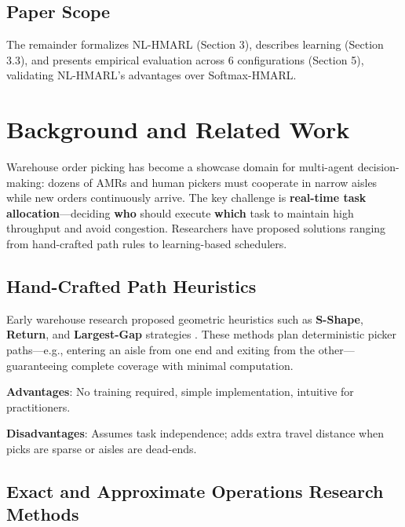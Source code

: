 \documentclass[12pt,a4paper]{article}
\begin{document}
\subsection{Paper Scope}

The remainder formalizes NL-HMARL (Section 3), describes learning (Section 3.3), and presents empirical evaluation across 6 configurations (Section 5), validating NL-HMARL's advantages over Softmax-HMARL.

\section{Background and Related Work}

Warehouse order picking has become a showcase domain for multi-agent decision-making: dozens of AMRs and human pickers must cooperate in narrow aisles while new orders continuously arrive. The key challenge is \textbf{real-time task allocation}---deciding \textbf{who} should execute \textbf{which} task to maintain high throughput and avoid congestion. Researchers have proposed solutions ranging from hand-crafted path rules to learning-based schedulers.

\subsection{Hand-Crafted Path Heuristics}

Early warehouse research proposed geometric heuristics such as \textbf{S-Shape}, \textbf{Return}, and \textbf{Largest-Gap} strategies \citep{ratliff1983sshape}. These methods plan deterministic picker paths---e.g., entering an aisle from one end and exiting from the other---guaranteeing complete coverage with minimal computation.

\textbf{Advantages}: No training required, simple implementation, intuitive for practitioners.

\textbf{Disadvantages}: Assumes task independence; adds extra travel distance when picks are sparse or aisles are dead-ends.

\subsection{Exact and Approximate Operations Research Methods}
\end{document}
